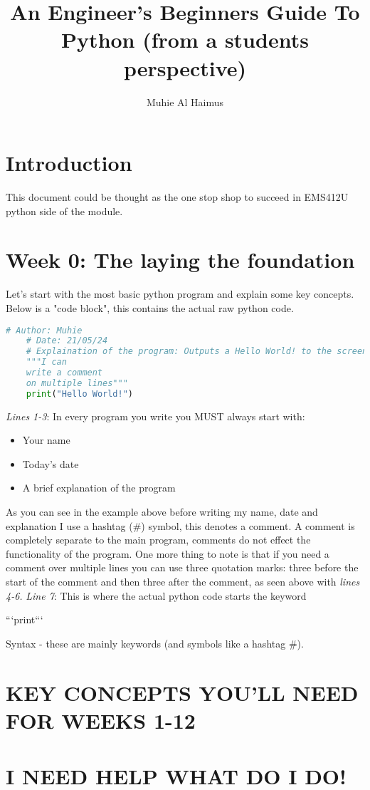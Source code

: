 \documentclass{article}
\title{An Engineer's Beginners Guide To Python (from a students perspective)}
\author{Muhie Al Haimus}
\begin{document}
	\maketitle
	\section{Introduction}
	This document could be thought as the one stop shop to succeed in EMS412U python side of the module.  
	 \section{Week 0: The laying the foundation}
	 Let's start with the most basic python program and explain some key concepts. Below is a "code block", this contains the actual raw python code.
	 
	\begin{lstlisting}[language=Python]
	# Author: Muhie
	# Date: 21/05/24
	# Explaination of the program: Outputs a Hello World! to the screen
	"""I can
	write a comment 
	on multiple lines"""
	print("Hello World!")
	\end{lstlisting}
	\emph{Lines 1-3}: In every program you write you MUST always start with:
	\begin{itemize}
		\item{Your name}
		\item{Today's date}
		\item{A brief explanation of the program}
	\end{itemize}
	As you can see in the example above before writing my name, date and explanation I use a hashtag (\#) symbol, this denotes a comment. A comment is completely separate to the main program, comments do not effect the functionality of the program. One more thing to note is that if you need a comment over multiple lines you can use three quotation marks: three before the start of the comment and then three after the comment, as seen above with \emph{lines 4-6.}
	\vspace{2mm}
	\emph{Line 7}: This is where the actual python code starts the keyword  
	\begin{markdown}
		```print```
	\end{markdown}
	
	
	 Syntax - these are mainly keywords (and symbols like a hashtag \#).
	 
	 
	 \section{KEY CONCEPTS YOU'LL NEED FOR WEEKS 1-12}
	 
	
	\section{I NEED HELP WHAT DO I DO!}
	
\end{document}
